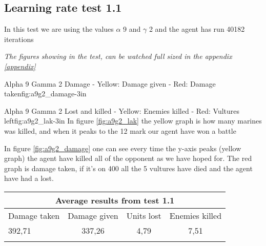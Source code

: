 \subsection*{Learning rate test 1.1}
In this test we are using the values $\alpha$ 9 and $\gamma$ 2 and the agent has run 40182 iterations


\textit{The figures showing in the test, can be watched full sized in the appendix \ref{appendix}} 

			{Alpha 9 Gamma 2 Damage - Yellow: Damage given - Red: Damage taken}{fig:a9g2_damage}{-3in}

			{Alpha 9 Gamma 2 Lost and killed - Yellow: Enemies killed - Red: Vultures left}{fig:a9g2_lak}{-3in}
In figure \ref{fig:a9g2_lak} the yellow graph is how many marines was killed, and when it peaks to the 12 mark our agent have won a battle




In figure \ref{fig:a9g2_damage} one can see every time the y-axis peaks (yellow graph) the agent have killed all of the opponent as we have hoped for. The red graph is damage taken, if it's on 400 all the 5 vultures have died and the agent have had a lost.

\begin{centering}
 \begin{tabular}{|l||c|c|c|}
	\multicolumn{4}{c}{Average results from test 1.1} \\
	\hline
		Damage taken & Damage given & Units lost & Enemies killed\\
	\hline
		392,71 & 337,26 & 4,79 & 7,51 \\
	\hline
\label{test1.1}
\end{tabular}
\end{centering}

